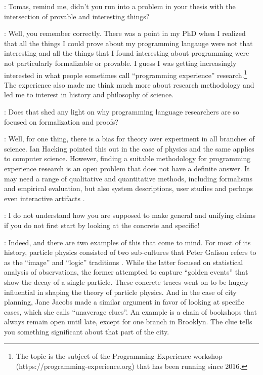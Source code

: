 \documentclass[runningheads]{llncs}
\newcommand{\T}{Tomas}
\newcommand{\J}{Joel}
\newcommand{\says}[2][gg]{\vspace{0.5em}\noindent\hangindent=0.5cm{\textsc{#1}}: #2}
\begin{document}
\says[\J]{Tomas, remind me, didn't you run into a problem in your thesis with the intersection of provable and interesting things?}

\says[\T]{Well, you remember correctly. There was a point in my PhD when I realized that all the things I could prove about my programming langauge were not that interesting and all the things that I found interesting about programming were not particularly formalizable or provable. I guess I was getting increasingly interested in what people sometimes call ``programming experience'' research.\footnote{The topic is the subject of the Programming Experience workshop\\ (https://programming-experience.org) that has been running since 2016.} The experience also made me think much more about research methodology and led me to interest in history and philosophy of science.}

\says[\J]{Does that shed any light on why programming language researchers are so focused on formalization and proofs?}

\says[\T]{Well, for one thing, there is a bias for theory over experiment in all branches of science. Ian Hacking \cite{hacking-1983-representing} pointed this out in the case of physics and the same applies to computer science. However, finding a suitable methodology for programming experience research is an open problem that does not have a definite answer. It may need a range of qualitative and quantitative methods, including formalisms and empirical evaluation, but also system descriptions, user studies and perhaps even interactive artifacts \cite{edwards-2019-eval}.}

\says[\J]{I do not understand how you are supposed to make general and unifying claims if you do not first start by looking at the concrete and specific!}

\says[\T]{Indeed, and there are two examples of this that come to mind. For most of its history, particle physics consisted of two sub-cultures that Peter Galison refers to as the ``image'' and ``logic'' traditions \cite{galison-1997-image}. While the latter focused on statistical analysis of observations, the former attempted to capture ``golden events'' that show the decay of a single particle. These concrete traces went on to be hugely influential in shaping the theory of particle physics. And in the case of city planning, Jane Jacobs made a similar argument \cite{jacobs-1961-death} in favor of looking at specific cases, which she calls ``unaverage clues''. An example is a chain of bookshops that always remain open until late, except for one branch in Brooklyn. The clue tells you something significant about that part of the city.}
\end{document}
